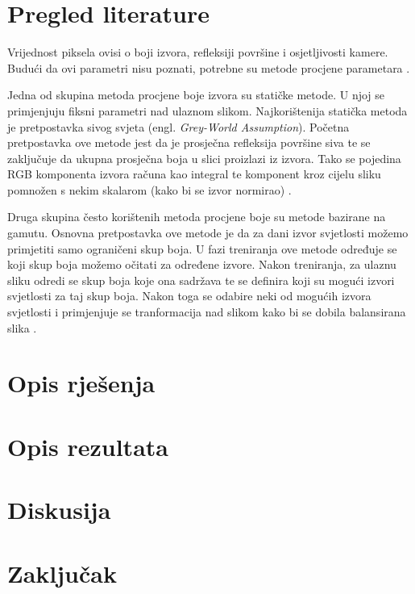 \documentclass[conference]{IEEEtran}
\begin{document}
\section{Pregled literature}
Vrijednost piksela ovisi o boji izvora, refleksiji površine i osjetljivosti kamere.
Budući da ovi parametri nisu poznati, potrebne su metode procjene parametara \cite{article}.

Jedna od skupina metoda procjene boje izvora su statičke metode. U njoj se primjenjuju
fiksni parametri nad ulaznom slikom. Najkorištenija statička metoda je pretpostavka sivog
svjeta (engl. \textit{Grey-World Assumption}). Početna pretpostavka ove metode jest da je
prosječna refleksija površine siva te se zaključuje da ukupna prosječna boja u slici proizlazi
iz izvora. Tako se pojedina RGB komponenta izvora računa kao integral te komponent kroz
cijelu sliku pomnožen s nekim skalarom (kako bi se izvor normirao) \cite{BUCHSBAUM19801}.

Druga skupina često korištenih metoda procjene boje su metode bazirane na gamutu.
Osnovna pretpostavka ove metode je da za dani izvor svjetlosti možemo primjetiti
samo ograničeni skup boja. U fazi treniranja ove metode određuje se koji skup boja
možemo očitati za određene izvore. Nakon treniranja, za ulaznu sliku odredi se skup
boja koje ona sadržava te se definira koji su mogući izvori svjetlosti za taj skup boja.
Nakon toga se odabire neki od mogućih izvora svjetlosti i primjenjuje se tranformacija nad
slikom kako bi se dobila balansirana slika \cite{Forsyth1990}.


\section{Opis rješenja}

\section{Opis rezultata}

\section{Diskusija}

\section{Zaključak}



\vspace{12pt}
\end{document}
